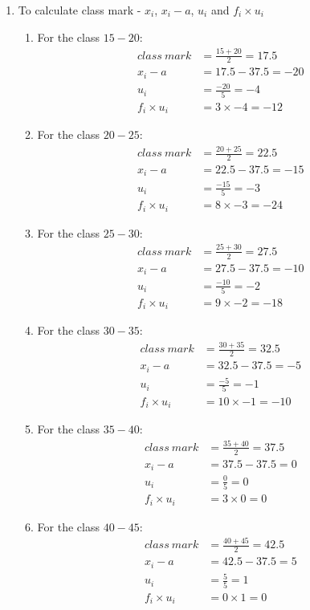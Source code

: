 \begin{enumerate}
\item To calculate class mark - $x_i$, $x_i - a$, $u_i$ and $f_i \times u_i$
\begin{enumerate}

\item For the class $15-20$:
\begin{align*}
class\ mark &= \frac{15+20}{2} = 17.5\\
x_i - a &= 17.5-37.5 = -20\\
u_i &= \frac{-20}{5} = -4 \\
f_i \times u_i &= 3 \times -4 = -12 
\end{align*}

\item For the class $20-25$:
\begin{align*}
class\ mark &= \frac{20+25}{2} = 22.5\\
x_i - a &= 22.5-37.5 = -15\\
u_i &= \frac{-15}{5} = -3\\ 
f_i \times u_i &= 8 \times -3 = -24 
\end{align*}

\item For the class $25-30$:
\begin{align*}
class\ mark &= \frac{25+30}{2} = 27.5\\
x_i - a &= 27.5-37.5 = -10\\
u_i &= \frac{-10}{5} = -2\\ 
f_i \times u_i &= 9 \times -2 = -18 
\end{align*}

\item For the class $30-35$:
\begin{align*}
class\ mark &= \frac{30+35}{2} = 32.5\\
x_i - a &= 32.5-37.5 = -5\\
u_i &= \frac{-5}{5} = -1\\ 
f_i \times u_i &= 10 \times -1 = -10 
\end{align*}

\item For the class $35-40$:
\begin{align*}
class\ mark &= \frac{35+40}{2} = 37.5\\
x_i - a &= 37.5-37.5 = 0\\
u_i &= \frac{0}{5} = 0 \\
f_i \times u_i &= 3 \times 0 = 0 
\end{align*}

\item For the class $40-45$:
\begin{align*}
class\ mark &= \frac{40+45}{2} = 42.5\\
x_i - a &= 42.5-37.5 = 5\\
u_i &= \frac{5}{5} = 1 \\
f_i \times u_i &= 0 \times 1 = 0 
\end{align*}


\end{enumerate}
\end{enumerate}
